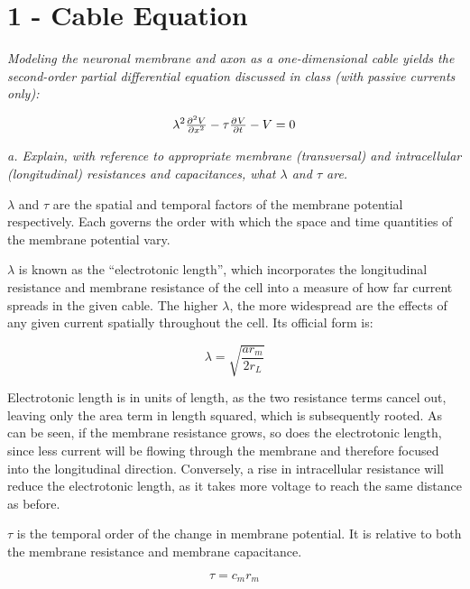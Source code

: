 \documentclass[12pt]{article}
\begin{document}
\maketitle

\section{1 - Cable Equation}

\emph{Modeling the neuronal membrane and axon as a one-dimensional cable yields the second-order partial differential equation discussed in class (with passive currents only):}

$$ \lambda^2\pd[2]{V}{x}-\tau\pd{V}{t}-V=0 $$

\vspace{6pt}

\emph{a.  Explain, with reference to appropriate membrane (transversal) and intracellular (longitudinal) resistances and capacitances, what $\lambda$ and $\tau$ are.}

\vspace{10pt}

$\lambda$ and $\tau$ are the spatial and temporal factors of the membrane potential respectively.  Each governs the order with which the space and time quantities of the membrane potential vary.  

$\lambda$ is known as the ``electrotonic length'', which incorporates the longitudinal resistance and membrane resistance of the cell into a measure of how far current spreads in the given cable.  The higher $\lambda$, the more widespread are the effects of any given current spatially throughout the cell.  Its official form is:

$$ \lambda=\sqrt{\frac{ar_m}{2r_L}} $$

Electrotonic length is in units of length, as the two resistance terms cancel out, leaving only the area term in length squared, which is subsequently rooted.  As can be seen, if the membrane resistance grows, so does the electrotonic length, since less current will be flowing through the membrane and therefore focused into the longitudinal direction.  Conversely, a rise in intracellular resistance will reduce the electrotonic length, as it takes more voltage to reach the same distance as before.

$\tau$ is the temporal order of the change in membrane potential.  It is relative to both the membrane resistance and membrane capacitance.  

$$ \tau=c_mr_m $$
\end{document}
